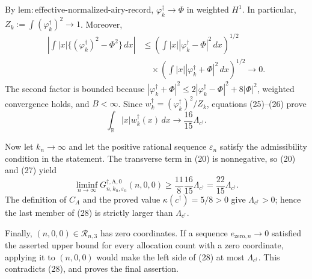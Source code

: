 By \(\mathrm{lem:effective\text{-}normalized\text{-}airy\text{-}record}\),
\(\varphi_k^\dagger\to\Phi\) in weighted \(H^1\).  In particular,
\(Z_k:=\int(\varphi_k^\dagger)^2\to1\).  Moreover,
\[
\begin{aligned}
\left|\int |x|\{(\varphi_k^\dagger)^2-\Phi^2\}\,dx\right|
&\leq
\left(\int |x||\varphi_k^\dagger-\Phi|^2\,dx\right)^{1/2}\\
&\quad\times
\left(\int |x||\varphi_k^\dagger+\Phi|^2\,dx\right)^{1/2}
\longrightarrow0.
\end{aligned}
\tag{26}
\]
The second factor is bounded because
\(|\varphi_k^\dagger+\Phi|^2\leq
2|\varphi_k^\dagger-\Phi|^2+8|\Phi|^2\), weighted convergence holds, and \(B<\infty\).  Since
\(w_k^\dagger=(\varphi_k^\dagger)^2/Z_k\), equations (25)--(26) prove
\[
\int_{\mathbb R}|x|w_k^\dagger(x)\,dx
\longrightarrow \frac{16}{15}\Lambda_{c^\dagger}.
\tag{27}
\]

Now let \(k_n\to\infty\) and let the positive rational sequence \(\varepsilon_n\) satisfy the admissibility condition in the statement.  The transverse term in (20) is nonnegative, so (20) and (27) yield
\[
\liminf_{n\to\infty}
G_{n,k_n,\varepsilon_n}^{\dagger,\mathrm A,0}(n,0,0)
\geq \frac{11}{8}\frac{16}{15}\Lambda_{c^\dagger}
=\frac{22}{15}\Lambda_{c^\dagger}.
\tag{28}
\]
The definition of \(C_A\) and the proved value \(\kappa(c^\dagger)=5/8>0\) give
\(\Lambda_{c^\dagger}>0\); hence the last member of (28) is strictly larger than \(\Lambda_{c^\dagger}\).

Finally, \((n,0,0)\in\mathcal R_{n,3}\) has zero coordinates.  If a sequence
\(e_{\mathrm{zero},n}\to0\) satisfied the asserted upper bound for every allocation count with a zero coordinate, applying it to \((n,0,0)\) would make the left side of (28) at most \(\Lambda_{c^\dagger}\).  This contradicts (28), and proves the final assertion.
